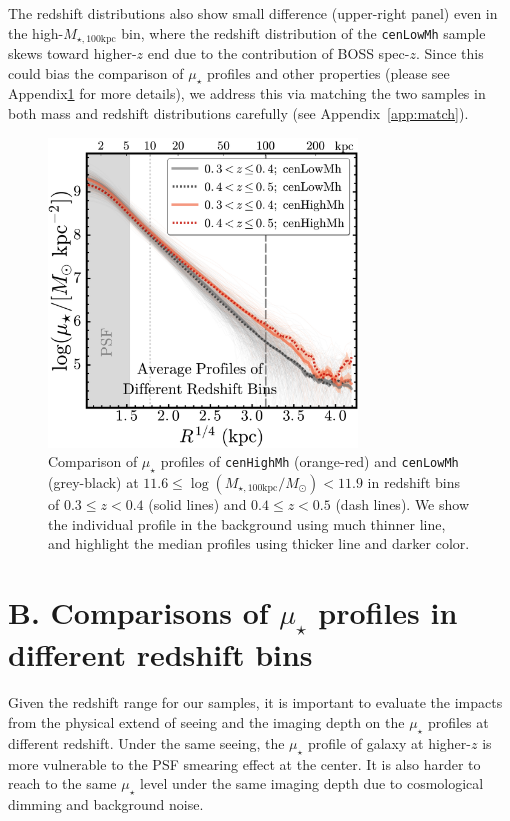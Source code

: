\documentclass[a4paper,fleqn,usenatbib]{mnras}
\def\rbcg{\texttt{cenHighMh}}
\def\nbcg{\texttt{cenLowMh}}
\def\mtot{{$M_{\star,100\mathrm{kpc}}$}}
\def\logmtot{{$\log (M_{\star,100\mathrm{kpc}}/M_{\odot})$}}
\def\mden{{$\mu_{\star}$}}
\begin{document}
    The redshift distributions also show small difference
    (upper-right panel) even in the high-\mtot{} bin, where the redshift distribution 
    of the \nbcg{} sample skews toward higher-$z$ end due to the contribution of BOSS 
    spec-$z$.
    Since this could bias the comparison of \mden{} profiles and other properties 
    (please see Appendix\ref{app:redshift} for more details), we address this via matching 
    the two samples in both mass and redshift distributions carefully
    (see Appendix~\ref{app:match}).
    
    
\begin{figure}
    \centering 
    \includegraphics[width=8.2cm]{fig/redbcg_avg_prof_z}
    \caption{
        Comparison of \mden{} profiles of \rbcg{} (orange-red) and \nbcg{} 
        (grey-black) at $11.6 \le$\logmtot$< 11.9$ in redshift bins of 
        $0.3\leq z<0.4$ (solid lines) and $0.4\leq z<0.5$ (dash lines). 
        We show the individual profile in the background using much thinner line, 
        and highlight the median profiles using thicker line and darker color.
        }
    \label{fig:avg_prof_z}
\end{figure}    


\section{B. Comparisons of \mden{} profiles in different redshift bins}
    \label{app:redshift}

    Given the redshift range for our samples, it is important to evaluate 
    the impacts from the physical extend of seeing and the imaging depth on the \mden{} 
    profiles at different redshift. 
    Under the same seeing, the \mden{} profile of galaxy at higher-$z$ is more 
    vulnerable to the PSF smearing effect at the center. 
    It is also harder to reach to the same \mden{} level under the same imaging depth 
    due to cosmological dimming and background noise. 
    
\end{document}
